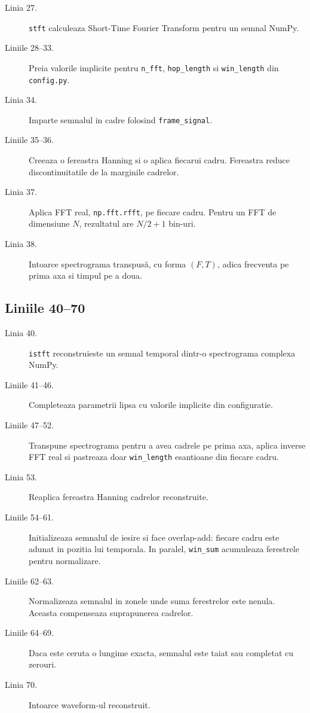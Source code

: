 \documentclass[12pt,a4paper]{report}
\newcommand{\codechunk}[2]{%
\subsection*{Liniile #1--#2}

}
\begin{document}
\begin{description}
    \item[Linia 27.] \texttt{stft} calculeaza Short-Time Fourier Transform pentru
    un semnal NumPy.

    \item[Liniile 28--33.] Preia valorile implicite pentru \texttt{n\_fft},
    \texttt{hop\_length} si \texttt{win\_length} din \texttt{config.py}.

    \item[Linia 34.] Imparte semnalul in cadre folosind \texttt{frame\_signal}.

    \item[Liniile 35--36.] Creeaza o fereastra Hanning si o aplica fiecarui cadru.
    Fereastra reduce discontinuitatile de la marginile cadrelor.

    \item[Linia 37.] Aplica FFT real, \texttt{np.fft.rfft}, pe fiecare cadru. Pentru
    un FFT de dimensiune \(N\), rezultatul are \(N/2+1\) bin-uri.

    \item[Linia 38.] Intoarce spectrograma transpusă, cu forma \((F,T)\), adica
    frecventa pe prima axa si timpul pe a doua.
\end{description}

\codechunk{40}{70}

\begin{description}
    \item[Linia 40.] \texttt{istft} reconstruieste un semnal temporal dintr-o
    spectrograma complexa NumPy.

    \item[Liniile 41--46.] Completeaza parametrii lipsa cu valorile implicite din
    configuratie.

    \item[Liniile 47--52.] Transpune spectrograma pentru a avea cadrele pe prima
    axa, aplica inverse FFT real si pastreaza doar \texttt{win\_length} esantioane
    din fiecare cadru.

    \item[Linia 53.] Reaplica fereastra Hanning cadrelor reconstruite.

    \item[Liniile 54--61.] Initializeaza semnalul de iesire si face overlap-add:
    fiecare cadru este adunat in pozitia lui temporala. In paralel, \texttt{win\_sum}
    acumuleaza ferestrele pentru normalizare.

    \item[Liniile 62--63.] Normalizeaza semnalul in zonele unde suma ferestrelor
    este nenula. Aceasta compenseaza suprapunerea cadrelor.

    \item[Liniile 64--69.] Daca este ceruta o lungime exacta, semnalul este taiat
    sau completat cu zerouri.

    \item[Linia 70.] Intoarce waveform-ul reconstruit.
\end{description}
\end{document}

